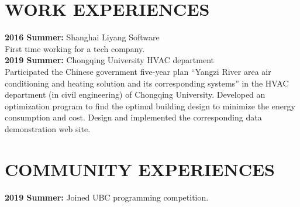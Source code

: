 \documentclass{res}
\begin{document}
\begin{resume}
\section{WORK EXPERIENCES}
    \textbf{2016 Summer:} Shanghai Liyang Software
    \vspace{0.05in}\\
    First time working for a tech company. \\
    \textbf{2019 Summer:} Chongqing University HVAC department
    \vspace{0.05in}\\
    Participated the Chinese government five-year plan ``Yangzi River area air conditioning and heating solution and its corresponding systems'' in the HVAC department (in civil engineering) of Chongqing University. Developed an optimization program to find the optimal building design to minimize the energy consumption and cost. Design and implemented the corresponding data demonstration web site.

\section{COMMUNITY EXPERIENCES}
    \textbf {2019 Summer:} Joined UBC programming competition.
\end{resume}
\end{document}
